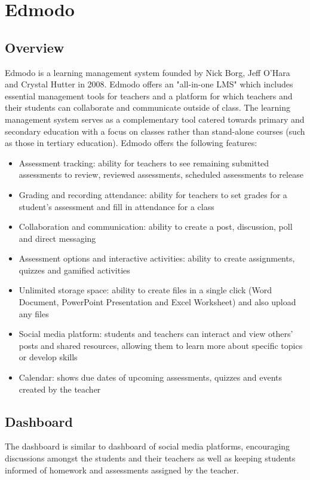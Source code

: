 \section{Edmodo}
\subsection{Overview}
Edmodo is a learning management system founded by Nick Borg, Jeff O'Hara and Crystal Hutter in 2008. Edmodo offers an "all-in-one LMS" which includes essential management tools for teachers and a platform for which teachers and their students can collaborate and communicate outside of class. The learning management system serves as a complementary tool catered towards primary and secondary education with a focus on classes rather than stand-alone courses (such as those in tertiary education). Edmodo offers the following features:

\begin{itemize}
    \item Assessment tracking: ability for teachers to see remaining submitted assessments to review, reviewed assessments, scheduled assessments to release
    \item Grading and recording attendance: ability for teachers to set grades for a student's assessment and fill in attendance for a class
    \item Collaboration and communication: ability to create a post, discussion, poll and direct messaging
    \item Assessment options and interactive activities: ability to create assignments, quizzes and gamified activities
    \item Unlimited storage space: ability to create files in a single click (Word Document, PowerPoint Presentation and Excel Worksheet) and also upload any files
    \item Social media platform: students and teachers can interact and view others' posts and shared resources, allowing them to learn more about specific topics or develop skills
    \item Calendar: shows due dates of upcoming assessments, quizzes and events created by the teacher
\end{itemize}

\subsection{Dashboard}
The dashboard is similar to dashboard of social media platforms, encouraging discussions amongst the students and their teachers as well as keeping students informed of homework and assessments assigned by the teacher.

